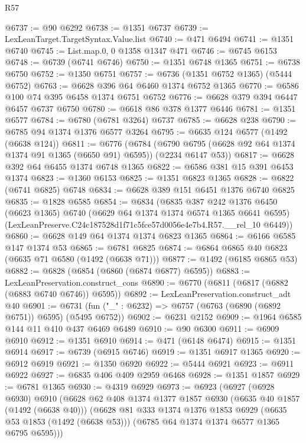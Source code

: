 \begin{lexlean}{R57}
\begin{coremodule}
@6737 := @90 @6292
@6738 := @1351 @6737
@6739 := LexLeanTarget.TargetSyntax.Value.list
@6740 := @471 @6494
@6741 := @1351 @6740
@6745 := List.map.{0, 0} @1358 @1347 @471
@6746 := @6745 @6153
@6748 := @6739 (@6741 @6746)
@6750 := @1351 @6748 @1365
@6751 := @6738 @6750
@6752 := @1350 @6751
@6757 := @6736 (@1351 @6752 @1365) (@5444 @6752)
@6763 := @6628 @396 @64 @6460 @1374 @6752 @1365
@6770 := @6586 @100 @74 @395 @6458 @1374 @6751 @6752
@6776 := @6628 @379 @394 @6447 @6457 @6737 @6750
@6780 := @6618 @86 @378 @1377 @6446
@6781 := @1351 @6577
@6784 := @6780 (@6781 @3264) @6737
@6785 := @6628 @238
@6790 := @6785 @94 @1374 @1376 @6577 @3264
@6795 := @6635 @124 @6577 (@1492 (@6638 @124))
@6811 := @6776
    (@6784 (@6790 @6795 (@6628 @92 @64 @1374 @1374 @91 @1365 (@6650 @91) @6595)) (@2234 @6147 @53))
@6817 := @6628 @392 @64 @6455 @1374 @6748 @1365
@6822 := @6586 @381 @15 @391 @6453 @1374
@6823 := @1360 @6153
@6825 := @1351 @6823 @1365
@6828 := @6822 (@6741 @6825) @6748
@6834 := @6628 @389 @151 @6451 @1376 @6740 @6825
@6835 := @1828 @6585
@6854 := @6834
    (@6835
      @387
      @242
      @1376
      @6450
      (@6623 @1365)
      @6740
      (@6629 @64 @1374 @1374 @6574 @1365 @6641 @6595)
      (LexLeanPreserve.C24c187528d1f71c5fce57d0056e4e7b4.R57.__rel_10 @6449))
@6860 := @6628 @149 @64 @1374 @1374 @6823 @1365
@6864 := @6166 @6585 @147 @1374 @53
@6865 := @6781 @6825
@6874 := @6864 @6865 @40 @6823 (@6635 @71 @6580 (@1492 (@6638 @71)))
@6877 := @1492 (@6185 @6865 @53)
@6882 := @6828 (@6854 (@6860 (@6874 @6877) @6595))
@6883 := LexLeanPreservation.construct_cons
@6890 := @6770 (@6811 (@6817 (@6882 (@6883 @6740 @6746)) @6595))
@6892 := LexLeanPreservation.construct_adt @40
@6901 := @6731 (fun ("_" : @6232) => @6757 (@6763 (@6890 (@6892 @6751)) @6595) (@5495 @6752))
@6902 := @6231 @2152
@6909 := @1964 @6585 @144 @11 @410 @437 @6469 @6489
@6910 := @90 @6300
@6911 := @6909 @6910
@6912 := @1351 @6910
@6914 := @471 (@6148 @6474)
@6915 := @1351 @6914
@6917 := @6739 (@6915 @6746)
@6919 := @1351 @6917 @1365
@6920 := @6912 @6919
@6921 := @1350 @6920
@6922 := @5444 @6921
@6923 := @6911 @6922
@6927 := @6835 @406 @409 @2959 @6468
@6928 := @1351 @1857
@6929 := @6781 @1365
@6930 := @4319 @6929
@6973 := @6923
    (@6927
      (@6928 @6930)
      @6910
      (@6628
        @62
        @408
        @1374
        @1377
        @1857
        @6930
        (@6635 @40 @1857 (@1492 (@6638 @40)))
        (@6628
          @81
          @333
          @1374
          @1376
          @1853
          @6929
          (@6635 @53 @1853 (@1492 (@6638 @53)))
          (@6785 @64 @1374 @1374 @6577 @1365 @6795 @6595)))

\end{coremodule}
\end{lexlean}
